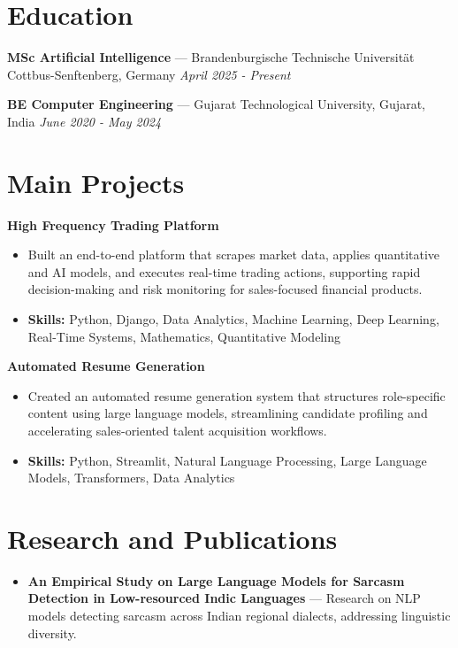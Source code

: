 \documentclass[a4paper,10pt]{article}
\begin{document}
\section*{Education}
\textbf{MSc Artificial Intelligence} — Brandenburgische Technische Universität Cottbus-Senftenberg, Germany \hfill \textit{April 2025 - Present}\par
\vspace{1.5pt}
\textbf{BE Computer Engineering} — Gujarat Technological University, Gujarat, India \hfill \textit{June 2020 - May 2024}\par

\section*{Main Projects}
\textbf{High Frequency Trading Platform}\par
\vspace{1pt}
\begin{itemize}
  \item Built an end-to-end platform that scrapes market data, applies quantitative and AI models, and executes real-time trading actions, supporting rapid decision-making and risk monitoring for sales-focused financial products.
  \item \textbf{Skills:} Python, Django, Data Analytics, Machine Learning, Deep Learning, Real-Time Systems, Mathematics, Quantitative Modeling
\end{itemize}
\vspace{3pt}
\textbf{Automated Resume Generation}\par
\vspace{1pt}
\begin{itemize}
  \item Created an automated resume generation system that structures role-specific content using large language models, streamlining candidate profiling and accelerating sales-oriented talent acquisition workflows.
  \item \textbf{Skills:} Python, Streamlit, Natural Language Processing, Large Language Models, Transformers, Data Analytics
\end{itemize}

\section*{Research and Publications}
\begin{itemize}
\item \textbf{An Empirical Study on Large Language Models for Sarcasm Detection in Low-resourced Indic Languages} — Research on NLP models detecting sarcasm across Indian regional dialects, addressing linguistic diversity.
\end{itemize}
\end{document}
